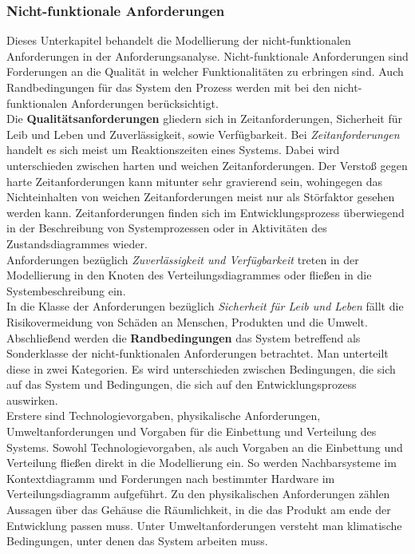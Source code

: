 \documentclass[../../../Bachelorarbeit.tex]{subfiles}
\begin{document}

\subsubsection{Nicht-funktionale Anforderungen}
Dieses Unterkapitel behandelt die Modellierung der nicht-funktionalen Anforderungen in der Anforderungsanalyse. Nicht-funktionale Anforderungen sind Forderungen an die Qualität in welcher Funktionalitäten zu erbringen sind. Auch Randbedingungen für das System \bzw den Prozess werden mit bei den nicht-funktionalen Anforderungen berücksichtigt.\\ %
Die \textbf{Qualitätsanforderungen} gliedern sich in Zeitanforderungen, Sicherheit für Leib und Leben und Zuverlässigkeit, sowie Verfügbarkeit. Bei \textit{Zeitanforderungen} handelt es sich meist um Reaktionszeiten eines Systems. Dabei wird unterschieden zwischen harten und weichen Zeitanforderungen. Der Verstoß gegen harte Zeitanforderungen kann mitunter sehr gravierend sein, wohingegen das Nichteinhalten von weichen Zeitanforderungen meist nur als Störfaktor gesehen werden kann. Zeitanforderungen finden sich im Entwicklungsprozess überwiegend in der Beschreibung von Systemprozessen oder in Aktivitäten des Zustandsdiagrammes wieder.\\
Anforderungen bezüglich \textit{Zuverlässigkeit und Verfügbarkeit} treten in der Modellierung in den Knoten des Verteilungsdiagrammes oder fließen in die Systembeschreibung ein.\\
In die Klasse der Anforderungen bezüglich \textit{Sicherheit für Leib und Leben} fällt die Risikovermeidung von Schäden an Menschen, Produkten und die Umwelt.\\
Abschließend werden die \textbf{Randbedingungen} das System betreffend als Sonderklasse der nicht-funktionalen Anforderungen betrachtet. Man unterteilt diese in zwei Kategorien. Es wird unterschieden zwischen Bedingungen, die sich auf das System und Bedingungen, die sich auf den Entwicklungsprozess auswirken.\\
Erstere sind Technologievorgaben, physikalische Anforderungen, Umweltanforderungen und Vorgaben für die Einbettung und Verteilung des Systems. Sowohl Technologievorgaben, als auch Vorgaben an die Einbettung und Verteilung fließen direkt in die Modellierung ein. So werden \bspw Nachbarsysteme im Kontextdiagramm und Forderungen nach bestimmter Hardware im Verteilungsdiagramm aufgeführt. Zu den physikalischen Anforderungen zählen \zB Aussagen über das Gehäuse \bzw die Räumlichkeit, in die das Produkt am ende der Entwicklung passen muss. Unter Umweltanforderungen versteht man \bspw klimatische Bedingungen, unter denen das System arbeiten muss.\\
\end{document}
